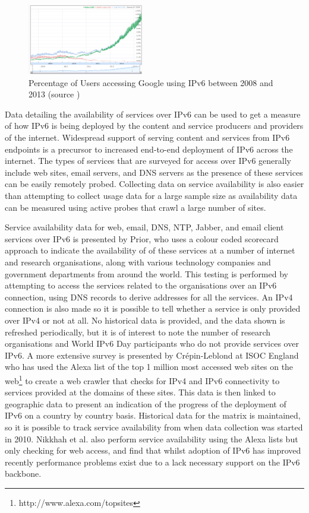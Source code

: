 \begin{figure}[htb]
\centering
\includegraphics[width=0.45\textwidth]{img/v6-google-access.png}
\caption{Percentage of Users accessing Google using IPv6 between 2008 and 2013
(source \protect\cite{google_inc._statistics:_2013})}
\label{fig:google-access}
\end{figure}

Data detailing the availability of services over IPv6 can be used to get a
measure of how IPv6 is being deployed by the content and service producers and
providers of the internet. Widespread support of serving content and services
from IPv6 endpoints is a precursor to increased end-to-end deployment of IPv6
across the internet. The types of services that are surveyed for access over
IPv6 generally include web sites, email servers, and DNS servers
as the presence of these services can be easily remotely probed. Collecting data
on service availability is also easier than attempting to collect usage data
for a large sample size as availability data can be measured using active probes
that crawl a large number of sites.

Service availability data for web, email, DNS, NTP, Jabber, and email client
services over IPv6 is presented by Prior, who uses a colour coded scorecard
approach to indicate the availability of of these services at a number of
internet and research organisations, along with various technology companies and
government departments from around the world\cite{prior_ipv6_2012}. This testing is performed by
attempting to access the services related to the organisations over an IPv6
connection, using DNS records to derive addresses for all the services. An IPv4
connection is also made so it is possible to tell whether a service is only
provided over IPv4 or not at all. No historical data is provided, and the data
shown is refreshed periodically, but it is of interest to note the number of
research organisations and World IPv6 Day participants who do not provide
services over IPv6. A more extensive survey is presented by Crépin-Leblond at
ISOC England who has used the Alexa list of the top 1 million most accessed web
sites on the web\footnote[2]{http://www.alexa.com/topsites}
to create a web crawler that checks for IPv4 and IPv6 connectivity to services provided
at the domains of these sites\cite{olivier_mj_crepin-leblond_ipv6_2010}. This
data is then linked to geographic data to present an indication of the progress
of the deployment of IPv6 on a country by country basis.
Historical data for the matrix is maintained, so it is possible to track service
availability from when data collection was started in 2010. Nikkhah et al. also
perform service availability using the Alexa lists but only checking for
web access, and find that whilst adoption of IPv6 has improved recently
performance problems exist due to a lack necessary support on the IPv6
backbone\cite{nikkhah_assessing_2011}.

